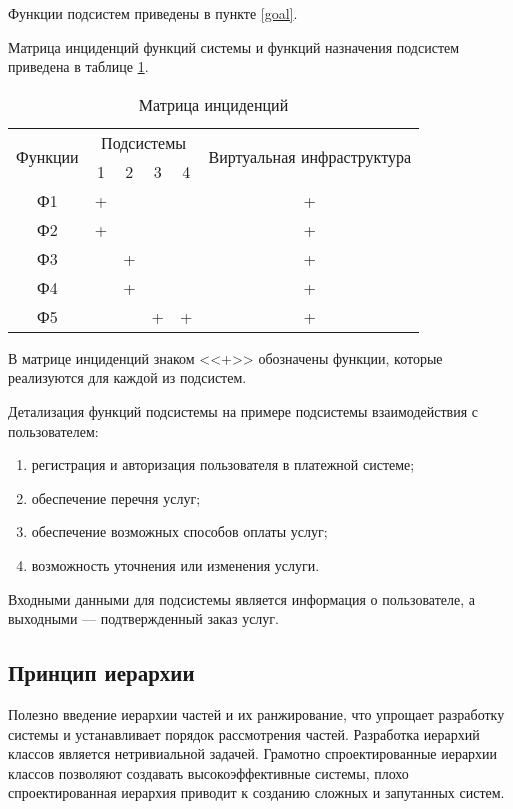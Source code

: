 Функции подсистем приведены в пункте \ref{goal}.

Матрица инциденций функций системы и функций назначения подсистем приведена в таблице \ref{inc-matrix}.
\begin{table}[H]
  \caption{Матрица инциденций}\label{inc-matrix}
  \begin{tabular}{|c|c|c|c|c|c|}
  \hline \multirow{2}{*}{Функции} & \multicolumn{4}{|c|}{Подсистемы} & \multirow{2}{*}{Виртуальная инфраструктура} \\
  \cline{2-5} & 1 & 2 & 3 & 4 & \\
  \hline Ф1 & + & & & & + \\
  \hline Ф2 & + & & & & + \\
  \hline Ф3 & & + & & & + \\
  \hline Ф4 & & + & & & + \\
  \hline Ф5 & & & + & + & + \\
  \hline 
  \end{tabular}
\end{table}

В матрице инциденций знаком <<+>> обозначены функции, которые реализуются для каждой из подсистем.

Детализация функций подсистемы на примере подсистемы взаимодействия с пользователем:
\begin{enumerate}
  \item регистрация и авторизация пользователя в платежной системе;
  \item обеспечение перечня услуг;
  \item обеспечение возможных способов оплаты услуг;
  \item возможность уточнения или изменения услуги.
\end{enumerate}

Входными данными для подсистемы является информация о пользователе, а выходными --- подтвержденный заказ услуг.

\subsection{Принцип иерархии}

Полезно введение иерархии частей и их ранжирование, что упрощает разработку системы и устанавливает порядок рассмотрения частей.
Разработка иерархий классов является нетривиальной задачей.
Грамотно спроектированные иерархии классов позволяют создавать высокоэффективные системы, плохо спроектированная иерархия приводит к созданию сложных и запутанных систем.

